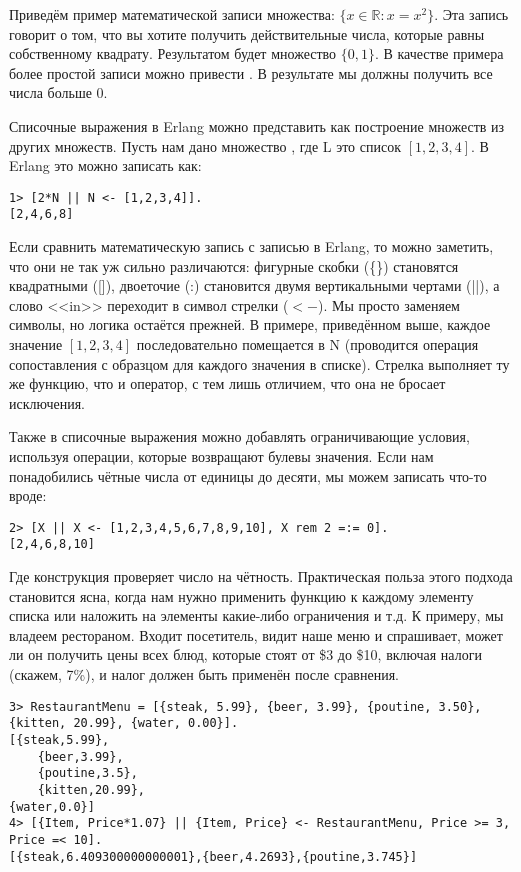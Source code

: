 Приведём пример математической записи множества: $\{x \in 
\mathbb{R}: x = x^2\}$. Эта запись говорит о том, что вы хотите получить действительные числа, которые равны собственному квадрату. Результатом будет множество $\{0, 1\}$. В качестве примера более простой записи можно привести . В результате мы должны получить все числа больше 0.

Списочные выражения в Erlang можно представить как построение множеств из других множеств. Пусть нам дано множество , где L это список $[1, 2, 3, 4]$. В Erlang это можно записать как:\\ 
\begin{lstlisting}[style=repl]
1> [2*N || N <- [1,2,3,4]].
[2,4,6,8]
\end{lstlisting}

Если сравнить математическую запись с записью в Erlang, то можно заметить, что они не так уж сильно различаются: фигурные скобки (\{\}) становятся квадратными ([]), двоеточие (:) становится двумя вертикальными чертами (||), а слово <<in>> переходит в символ стрелки ($<-$). Мы просто заменяем символы, но логика остаётся прежней. В примере, приведённом выше, каждое значение $[1, 2, 3, 4]$ последовательно помещается в N (проводится операция сопоставления с образцом для каждого значения в списке). Стрелка выполняет ту же функцию, что и оператор\ops{=}, с тем лишь отличием, что она не бросает исключения.

Также в списочные выражения можно добавлять ограничивающие условия, используя операции, которые возвращают булевы значения. Если нам понадобились чётные числа от единицы до десяти, мы можем записать что\--то вроде:
\begin{lstlisting}[style=repl]
2> [X || X <- [1,2,3,4,5,6,7,8,9,10], X rem 2 =:= 0].
[2,4,6,8,10]
\end{lstlisting}

Где конструкция  проверяет число на чётность. Практическая польза этого подхода становится ясна, когда нам нужно применить функцию к каждому элементу списка или наложить на элементы какие\--либо ограничения и т.д. К примеру, мы владеем рестораном. Входит посетитель, видит наше меню и спрашивает, может ли он получить цены всех блюд, которые стоят от \$3 до \$10, включая налоги (скажем, 7\%), и налог должен быть применён после сравнения.
\begin{lstlisting}[style=repl]
3> RestaurantMenu = [{steak, 5.99}, {beer, 3.99}, {poutine, 3.50}, {kitten, 20.99}, {water, 0.00}].
[{steak,5.99},
    {beer,3.99},
    {poutine,3.5},
    {kitten,20.99},
{water,0.0}]
4> [{Item, Price*1.07} || {Item, Price} <- RestaurantMenu, Price >= 3, Price =< 10].
[{steak,6.409300000000001},{beer,4.2693},{poutine,3.745}]
\end{lstlisting}

